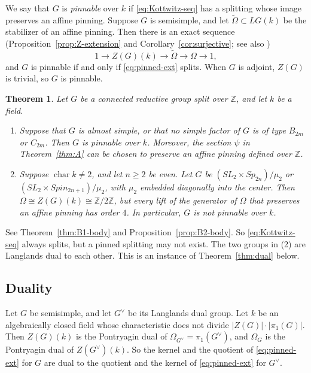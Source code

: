 \documentclass[psamsfonts]{amsart}
\theoremstyle{definition}
\theoremstyle{remark}
\numberwithin{equation}{section}
\newcommand{\Z}{\mathbb{Z}}   %
\newcommand{\ra}{\rightarrow}
\newcommand{\tOm}{\widetilde{\Omega}}
\DeclareMathOperator{\chara}{char}
\numberwithin{equation}{section}
\newcommand{\Om}{\Omega}
\theoremstyle{plain}
\newtheorem{introthm}{Theorem}
\begin{document}
We say that $G$ is \emph{pinnable} over $k$ if \eqref{eq:Kottwitz-seq} has a splitting whose image preserves an affine pinning. Suppose $G$ is semisimple, and let $\tOm\subset LG(k)$ be the stabilizer of an affine pinning. Then there is an exact sequence (Proposition~\ref{prop:Z-extension} and Corollary~\ref{cor:surjective}; see also \cite[Proposition~3.14]{DLYZ})
\begin{equation}\label{eq:pinned-ext}
1\ra Z(G)(k)\ra\tOm\ra\Om\ra 1,
\end{equation}
and $G$ is pinnable if and only if \eqref{eq:pinned-ext} splits. When $G$ is adjoint, $Z(G)$ is trivial, so $G$ is pinnable.

\begin{introthm}\label{thm:B}
Let $G$ be a connected reductive group split over $\Z$, and let $k$ be a field.
\begin{enumerate}[(1)]
\item Suppose that $G$ is almost simple, or that no simple factor of $G$ is of type $B_{2m}$ or $C_{2m}$. Then $G$ is pinnable over $k$. Moreover, the section $\psi$ in Theorem~\ref{thm:A} can be chosen to preserve an affine pinning defined over $\Z$.
\item Suppose $\chara k\neq 2$, and let $n\geq 2$ be even. Let $G$ be $(SL_2\times Sp_{2n})/\mu_2$ or $(SL_2\times Spin_{2n+1})/\mu_2$, with $\mu_2$ embedded diagonally into the center. Then $\Om\cong Z(G)(k)\cong\Z/2\Z$, but every lift of the generator of $\Om$ that preserves an affine pinning has order $4$. In particular, $G$ is not pinnable over $k$.
\end{enumerate}
\end{introthm}

See Theorem~\ref{thm:B1-body} and Proposition~\ref{prop:B2-body}. So \eqref{eq:Kottwitz-seq} always splits, but a pinned splitting may not exist. The two groups in (2) are Langlands dual to each other. This is an instance of Theorem~\ref{thm:dual} below.

\subsection*{Duality}
Let $G$ be semisimple, and let $G^\vee$ be its Langlands dual group. Let $k$ be an algebraically closed field whose characteristic does not divide $|Z(G)|\cdot|\pi_1(G)|$. Then $Z(G)(k)$ is the Pontryagin dual of $\Om_{G^\vee}=\pi_1(G^\vee)$, and $\Om_G$ is the Pontryagin dual of $Z(G^\vee)(k)$. So the kernel and the quotient of \eqref{eq:pinned-ext} for $G$ are dual to the quotient and the kernel of \eqref{eq:pinned-ext} for $G^\vee$.
\end{document}
